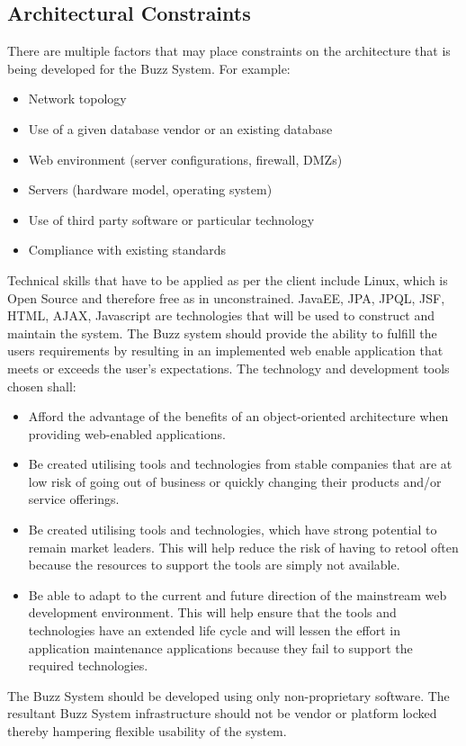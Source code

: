 \documentclass[a4paper]{article}
\begin{document}
\subsection{Architectural Constraints}
There are multiple factors that may place constraints on the architecture that is being developed for the Buzz System. For example:
\begin{itemize}
\item	Network topology
\item	Use of a given database vendor or an existing database
\item	Web environment (server configurations, firewall, DMZs)
\item	Servers (hardware model, operating system)
\item	Use of third party software or particular technology
\item	Compliance with existing standards
\end{itemize}
Technical skills that have to be applied as per the client include Linux, which is Open Source and therefore free as in unconstrained. JavaEE, JPA, JPQL, JSF, HTML, AJAX, Javascript are technologies that will be used to construct and maintain the system. The Buzz system should provide the ability to fulfill the users requirements by resulting in an implemented web enable application that meets or exceeds the user’s expectations. The technology and development tools chosen shall:
\begin{itemize}
\item Afford the advantage of the benefits of an object-oriented architecture when providing web-enabled applications.
\item	Be created utilising tools and technologies from stable companies that are at low risk of going out of business or quickly changing their products and/or service offerings.
\item	Be created utilising tools and technologies, which have strong potential to remain market leaders. This will help reduce the risk of having to retool often because the resources to support the tools are simply not available.
\item	Be able to adapt to the current and future direction of the mainstream web development environment. This will help ensure that the tools and technologies have an extended life cycle and will lessen the effort in application maintenance applications because they fail to support the required technologies.
\end{itemize}
The Buzz System should be developed using only non-proprietary software. The resultant Buzz System infrastructure should not be vendor or platform locked thereby hampering flexible usability of the system.
\end{document}
